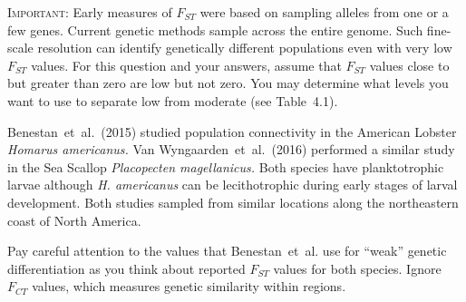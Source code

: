 \documentclass[12pt, addpoints]{exam}
\newcommand{\fst}{$F_{ST}$}
\begin{document}
\begin{questions}
\begin{EnvFullwidth}
\textsc{Important:} Early measures of $F_{ST}$ were based on sampling alleles from one or a few genes. Current genetic methods sample across the entire genome. Such fine-scale resolution can identify genetically different populations even with very low $F_{ST}$ values. For this question and your answers, assume that $F_{ST}$ values close to but greater than zero are low but not zero. You may determine what levels you want to use to separate low from moderate (see Table~4.1). 

\end{EnvFullwidth}

\question\label{ques:dispersal}
Benestan~et~al.~(2015) studied population connectivity in the American Lobster \textit{Homarus americanus.} Van Wyngaarden~et~al.~(2016) performed a similar study in the Sea Scallop 
\textit{Placopecten magellanicus.} Both species have planktotrophic larvae although \textit{H. americanus} can be lecithotrophic during early stages of larval development. Both studies sampled from similar locations along the northeastern coast of North America.

Pay careful attention to the values that Benestan~et~al. use for “weak” genetic differentiation as you think about reported $F_{ST}$ values for both species. Ignore $F_{CT}$ values, which measures genetic similarity within regions.

\end{questions}
\end{document}
